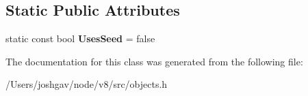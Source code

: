 \subsection*{Static Public Attributes}
\begin{DoxyCompactItemize}
\item 
static const bool {\bfseries Uses\+Seed} = false\hypertarget{classv8_1_1internal_1_1_base_shape_a544eca693001174d4f4be9dec8b5b7aa}{}\label{classv8_1_1internal_1_1_base_shape_a544eca693001174d4f4be9dec8b5b7aa}

\end{DoxyCompactItemize}


The documentation for this class was generated from the following file\+:\begin{DoxyCompactItemize}
\item 
/\+Users/joshgav/node/v8/src/objects.\+h\end{DoxyCompactItemize}

